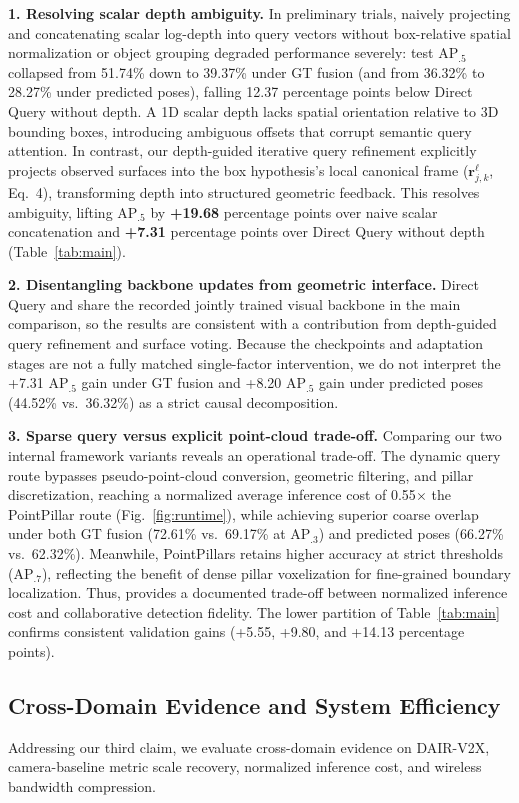 \textbf{1. Resolving scalar depth ambiguity.} In preliminary trials, naively projecting and concatenating scalar log-depth into query vectors without box-relative spatial normalization or object grouping degraded performance severely: test AP$_{.5}$ collapsed from 51.74\% down to 39.37\% under GT fusion (and from 36.32\% to 28.27\% under predicted poses), falling 12.37 percentage points below Direct Query without depth. A 1D scalar depth lacks spatial orientation relative to 3D bounding boxes, introducing ambiguous offsets that corrupt semantic query attention. In contrast, our depth-guided iterative query refinement explicitly projects observed surfaces into the box hypothesis's local canonical frame ($\mathbf{r}_{j,k}^\ell$, Eq.~4), transforming depth into structured geometric feedback. This resolves ambiguity, lifting AP$_{.5}$ by \textbf{+19.68} percentage points over naive scalar concatenation and \textbf{+7.31} percentage points over Direct Query without depth (Table~\ref{tab:main}).

\textbf{2. Disentangling backbone updates from geometric interface.} Direct Query and \method{} share the recorded jointly trained visual backbone in the main comparison, so the results are consistent with a contribution from depth-guided query refinement and surface voting. Because the checkpoints and adaptation stages are not a fully matched single-factor intervention, we do not interpret the +7.31 AP$_{.5}$ gain under GT fusion and +8.20 AP$_{.5}$ gain under predicted poses (44.52\% vs.\ 36.32\%) as a strict causal decomposition.

\textbf{3. Sparse query versus explicit point-cloud trade-off.} Comparing our two internal framework variants reveals an operational trade-off. The dynamic query route bypasses pseudo-point-cloud conversion, geometric filtering, and pillar discretization, reaching a normalized average inference cost of 0.55$\times$ the PointPillar route (Fig.~\ref{fig:runtime}), while achieving superior coarse overlap under both GT fusion (72.61\% vs.\ 69.17\% at AP$_{.3}$) and predicted poses (66.27\% vs.\ 62.32\%). Meanwhile, PointPillars retains higher accuracy at strict thresholds (AP$_{.7}$), reflecting the benefit of dense pillar voxelization for fine-grained boundary localization. Thus, \method{} provides a documented trade-off between normalized inference cost and collaborative detection fidelity. The lower partition of Table~\ref{tab:main} confirms consistent validation gains (+5.55, +9.80, and +14.13 percentage points).

\subsection{Cross-Domain Evidence and System Efficiency}
\label{sec:system_efficiency}
Addressing our third claim, we evaluate cross-domain evidence on DAIR-V2X, camera-baseline metric scale recovery, normalized inference cost, and wireless bandwidth compression.

